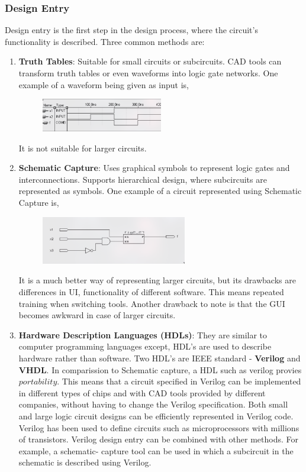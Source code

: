 \documentclass[twocolumn]{article}
\begin{document}
      \subsubsection{Design Entry}
      Design entry is the first step in the design process, where the circuit's functionality is described. Three common methods are:
      \begin{enumerate}
        \item \textbf{Truth Tables}: Suitable for small circuits or subcircuits. CAD tools can transform truth tables or even waveforms into logic gate networks. One example of a waveform being given as input is,
          \begin{figure}[h!]
            \centering
            \includegraphics[width = 0.5\textwidth]{waveform.png}
            \label{stemplot}
          \end{figure}
          It is not suitable for larger circuits.
        \item \textbf{Schematic Capture}: Uses graphical symbols to represent logic gates and interconnections. Supports hierarchical design, where subcircuits are represented as symbols. One example of a circuit represented using Schematic Capture is,
          \begin{figure}[h!]
            \centering
            \includegraphics[width = 0.6\textwidth]{sc.png}
            \label{stemplot}
          \end{figure}
          It is a much better way of representing larger circuits, but its drawbacks are differences in UI, functionality of different software. This means repeated training when switching tools. Another drawback to note is that the GUI becomes awkward in case of larger circuits.
        \item \textbf{Hardware Description Languages (HDLs)}: They are similar to computer programming languages except, HDL's are used to describe hardware rather than software. Two HDL's are IEEE standard - \textbf{Verilog} and \textbf{VHDL}. In comparission to Schematic capture, a HDL such as verilog provies $portability$. This means that a circuit specified in Verilog can be implemented in different types of chips and with CAD tools provided by different companies, without having to change the Verilog specification. Both small and large logic circuit designs can be efficiently represented in Verilog code. Verilog has been used to define circuits such as microprocessors with millions of transistors. Verilog design entry can be combined with other methods. For example, a schematic-
          capture tool can be used in which a subcircuit in the schematic is described using Verilog.
      \end{enumerate}
\end{document}
